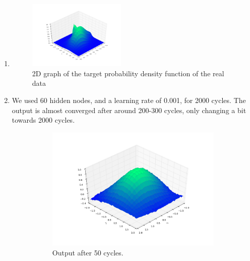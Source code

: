 \documentclass[a4paper,10pt]{article}
\numberwithin{equation}{section} %
\numberwithin{figure}{section} %
\numberwithin{table}{section} %
\theoremstyle{mytheor}
\begin{document}
\begin{enumerate}
	\item \begin{figure}[h!]
   			\centering
   			\includegraphics[width=0.44\textwidth]{ex2_5.png}\vspace{-0.6cm}
   			\caption{\vspace{-0.1cm} 2D graph of the target probability density function of the real data}\vspace{-0.2cm}
  		\end{figure}
	\item We used 60 hidden nodes, and a learning rate of 0.001, for 2000 cycles. The output is almost converged after around 200-300 cycles, only changing a bit towards 2000 cycles.
		\begin{figure}[h!]
			\centering
			\begin{subfigure}[b]{0.45\textwidth}
				\includegraphics[width=\textwidth]{plot/ex2_6_50.png}\vspace{-0.5cm}
				\caption{Output after 50 cycles.}
			\end{subfigure}
			\begin{subfigure}[b]{0.45\textwidth}

\end{subfigure}
\end{figure}
\end{enumerate}
\end{document}
